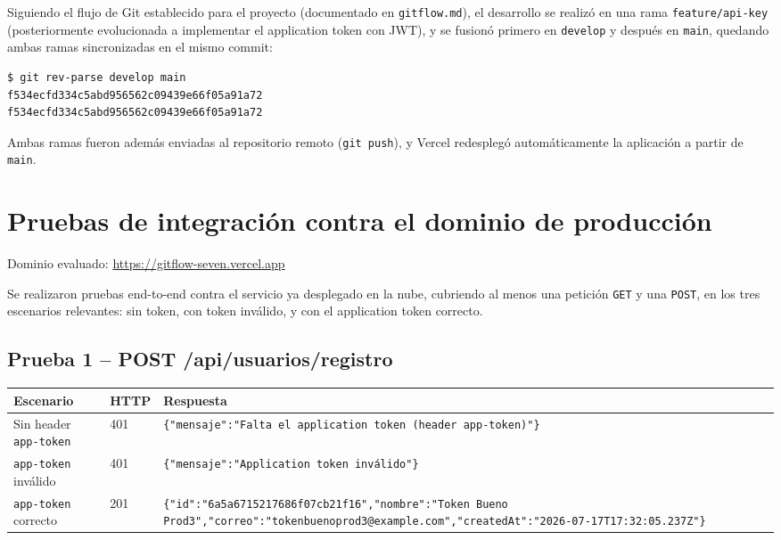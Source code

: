 \documentclass[11pt,letterpaper]{article}
\begin{document}
Siguiendo el flujo de Git establecido para el proyecto (documentado en \texttt{gitflow.md}), el
desarrollo se realizó en una rama \texttt{feature/api-key} (posteriormente evolucionada a
implementar el application token con JWT), y se fusionó primero en \texttt{develop} y después en
\texttt{main}, quedando ambas ramas sincronizadas en el mismo commit:

\begin{lstlisting}[caption=Verificación de sincronización entre develop y main]
$ git rev-parse develop main
f534ecfd334c5abd956562c09439e66f05a91a72
f534ecfd334c5abd956562c09439e66f05a91a72
\end{lstlisting}

Ambas ramas fueron además enviadas al repositorio remoto (\texttt{git push}), y Vercel
redesplegó automáticamente la aplicación a partir de \texttt{main}.

\newpage
\section{Pruebas de integración contra el dominio de producción}

Dominio evaluado: \url{https://gitflow-seven.vercel.app}

Se realizaron pruebas end-to-end contra el servicio ya desplegado en la nube, cubriendo al menos
una petición \texttt{GET} y una \texttt{POST}, en los tres escenarios relevantes: sin token, con
token inválido, y con el application token correcto.

\subsection{Prueba 1 -- POST /api/usuarios/registro}

\begin{longtable}{p{4.5cm}p{2cm}p{7.5cm}}
\toprule
\textbf{Escenario} & \textbf{HTTP} & \textbf{Respuesta} \\
\midrule
\endhead
Sin header \texttt{app-token} & 401 & \texttt{\{"mensaje":"Falta el application token (header app-token)"\}} \\
\texttt{app-token} inválido & 401 & \texttt{\{"mensaje":"Application token inválido"\}} \\
\texttt{app-token} correcto & 201 & \texttt{\{"id":"6a5a6715217686f07cb21f16","nombre":"Token Bueno Prod3","correo":"tokenbuenoprod3@example.com","createdAt":"2026-07-17T17:32:05.237Z"\}} \\
\bottomrule
\end{longtable}
\end{document}
